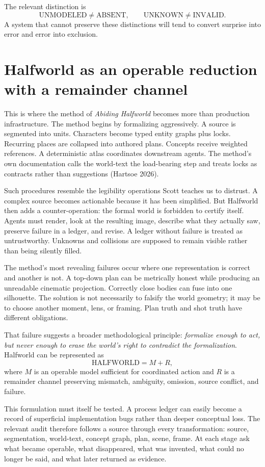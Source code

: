 \documentclass[11pt]{article}
\begin{document}
The relevant distinction is
\[
\text{UNMODELED} \neq \text{ABSENT}, \qquad \text{UNKNOWN} \neq \text{INVALID}.
\]
A system that cannot preserve these distinctions will tend to convert surprise into error and error into exclusion.

\section{Halfworld as an operable reduction with a remainder channel}

This is where the method of \emph{Abiding Halfworld} becomes more than production infrastructure. The method begins by formalizing aggressively. A source is segmented into units. Characters become typed entity graphs plus locks. Recurring places are collapsed into authored plans. Concepts receive weighted references. A deterministic atlas coordinates downstream agents. The method's own documentation calls the world-text the load-bearing step and treats locks as contracts rather than suggestions (Hartsoe 2026).

Such procedures resemble the legibility operations Scott teaches us to distrust. A complex source becomes actionable because it has been simplified. But Halfworld then adds a counter-operation: the formal world is forbidden to certify itself. Agents must render, look at the resulting image, describe what they actually saw, preserve failure in a ledger, and revise. A ledger without failure is treated as untrustworthy. Unknowns and collisions are supposed to remain visible rather than being silently filled.

The method's most revealing failures occur where one representation is correct and another is not. A top-down plan can be metrically honest while producing an unreadable cinematic projection. Correctly close bodies can fuse into one silhouette. The solution is not necessarily to falsify the world geometry; it may be to choose another moment, lens, or framing. Plan truth and shot truth have different obligations.

That failure suggests a broader methodological principle: \emph{formalize enough to act, but never enough to erase the world's right to contradict the formalization}. Halfworld can be represented as
\[
\text{HALFWORLD} = M + R,
\]
where $M$ is an operable model sufficient for coordinated action and $R$ is a remainder channel preserving mismatch, ambiguity, omission, source conflict, and failure.

This formulation must itself be tested. A process ledger can easily become a record of superficial implementation bugs rather than deeper conceptual loss. The relevant audit therefore follows a source through every transformation: source, segmentation, world-text, concept graph, plan, scene, frame. At each stage ask what became operable, what disappeared, what was invented, what could no longer be said, and what later returned as evidence.
\end{document}
